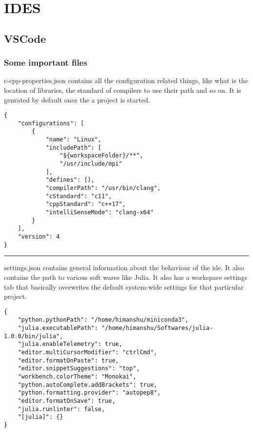 \chapter{IDES}

\section{VSCode}

\subsection{Some important files}

c-cpp-properties.json contains all the configuration related things, like what is the location of libraries, the standard of compilers to use their path and so on. It is genrated by default once the a project is started.

\bigbreak

\begin{lstlisting}
{
    "configurations": [
        {
            "name": "Linux",
            "includePath": [
                "${workspaceFolder}/**",
                "/usr/include/mpi"
            ],
            "defines": [],
            "compilerPath": "/usr/bin/clang",
            "cStandard": "c11",
            "cppStandard": "c++17",
            "intelliSenseMode": "clang-x64"
        }
    ],
    "version": 4
}
\end{lstlisting}


\bigbreak
\noindent\rule{\textwidth}{1pt}
\bigbreak
\noindent
settings.json contains general information about the behaviour of the ide. It also contains the path to various soft wares like Julia. It also has a workspace settings tab that basically overwrites the default system-wide settings for that particular project.\\

\begin{lstlisting}
{
    "python.pythonPath": "/home/himanshu/miniconda3",
    "julia.executablePath": "/home/himanshu/Softwares/julia-1.0.0/bin/julia",
    "julia.enableTelemetry": true,
    "editor.multiCursorModifier": "ctrlCmd",
    "editor.formatOnPaste": true,
    "editor.snippetSuggestions": "top",
    "workbench.colorTheme": "Monokai",
    "python.autoComplete.addBrackets": true,
    "python.formatting.provider": "autopep8",
    "editor.formatOnSave": true,
    "julia.runlinter": false,
    "[julia]": {}
}
\end{lstlisting}

